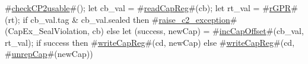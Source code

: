 #\hyperref[sailMIPSzcheckCP2usable]{checkCP2usable}#();
let cb_val = #\hyperref[sailMIPSzreadCapReg]{readCapReg}#(cb);
let rt_val = #\hyperref[sailMIPSzrGPR]{rGPR}#(rt);
if cb_val.tag & cb_val.sealed then
  #\hyperref[sailMIPSzraisezyc2zyexception]{raise\_c2\_exception}#(CapEx_SealViolation, cb)
else
{
  let (success, newCap) = #\hyperref[sailMIPSzincCapOffset]{incCapOffset}#(cb_val, rt_val);
  if success then
      #\hyperref[sailMIPSzwriteCapReg]{writeCapReg}#(cd, newCap)
  else
      #\hyperref[sailMIPSzwriteCapReg]{writeCapReg}#(cd, #\hyperref[sailMIPSzunrepCap]{unrepCap}#(newCap))
}
